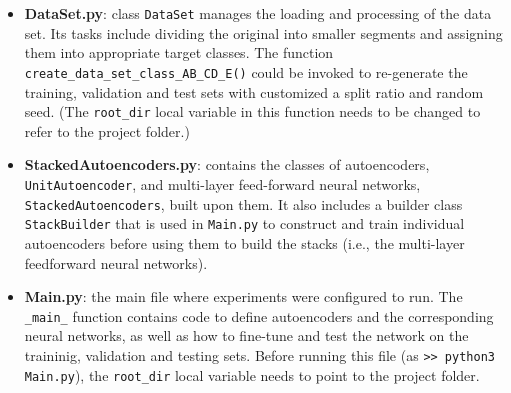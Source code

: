 \documentclass[12pt]{article}
\begin{document}
\begin{itemize}
\item \textbf{DataSet.py}: class \texttt{DataSet} manages the loading and processing of the data set. Its tasks include dividing the original into smaller segments and assigning them into appropriate target classes. The function \texttt{create\_data\_set\_class\_AB\_CD\_E()} could be invoked to re-generate the training, validation and test sets with customized a split ratio and random seed. (The \texttt{root\_dir} local variable in this function needs to be changed to refer to the project folder.)
\item \textbf{StackedAutoencoders.py}: contains the classes of autoencoders, \texttt{UnitAutoencoder}, and multi-layer feed-forward neural networks, \texttt{StackedAutoencoders}, built upon them. It also includes a builder class \texttt{StackBuilder} that is used in \texttt{Main.py} to construct and train individual autoencoders before using them to build the stacks (i.e., the multi-layer feedforward neural networks).
\item \textbf{Main.py}: the main file where experiments were configured to run. The \texttt{\_main\_} function contains code to define autoencoders and the corresponding neural networks, as well as how to fine-tune and test the network on the traininig, validation and testing sets. Before running this file (as \texttt{>> python3 Main.py}), the \texttt{root\_dir} local variable needs to point to the project folder.
\end{itemize}


\end{document}
